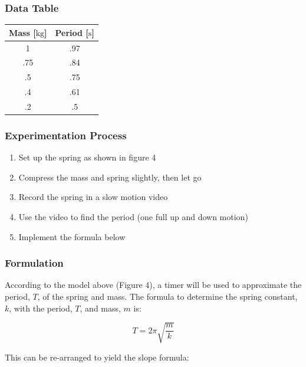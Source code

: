 \documentclass{article}
\begin{document}
\subsubsection{Data Table}
\begin{center}
\begin{tabular}{|c|c|}
\hline
    Mass [$\si{\kilo\gram}$] & Period [$\si{\second}$]\\
\hline
    1 & .97\\
\hline
    .75 & .84\\
\hline
    .5 & .75 \\
\hline
    .4 & .61 \\
\hline
    .2 & .5 \\
\hline
\end{tabular}
\end{center}

\subsubsection{Experimentation Process}

\begin{enumerate}
    
    \item Set up the spring as shown in figure 4
    
    \item Compress the mass and spring slightly, then let go
    
    \item Record the spring in a slow motion video 
    
    \item Use the video to find the period (one full up and down motion)
    
    \item Implement the formula below
    
\end{enumerate}


\subsubsection{Formulation}
According to the model above (Figure 4), a timer will be used to approximate the period, $T$, of the spring and mass.
The formula to determine the spring constant, $k$, with the period, $T$, and mass, $m$ is:

$$T = 2\pi\sqrt{\frac{m}{k}}$$

This can be re-arranged to yield the slope formula:
\end{document}
